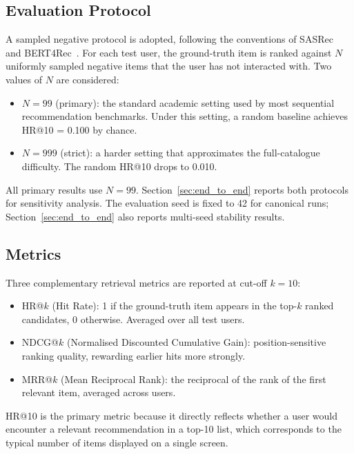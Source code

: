 \subsection{Evaluation Protocol}

A sampled negative protocol is adopted, following the conventions of SASRec~\cite{kang2018self} and BERT4Rec~\cite{sun2019bert4rec}.
For each test user, the ground-truth item is ranked against $N$ uniformly sampled negative items that the user has not interacted with.
Two values of $N$ are considered:

\begin{itemize}
    \item $N = 99$ (primary): the standard academic setting used by most sequential recommendation benchmarks.
    Under this setting, a random baseline achieves HR@10 = 0.100 by chance.
    \item $N = 999$ (strict): a harder setting that approximates the full-catalogue difficulty.
    The random HR@10 drops to 0.010.
\end{itemize}

All primary results use $N = 99$.
Section~\ref{sec:end_to_end} reports both protocols for sensitivity analysis.
The evaluation seed is fixed to 42 for canonical runs; Section~\ref{sec:end_to_end} also reports multi-seed stability results.

\subsection{Metrics}

Three complementary retrieval metrics are reported at cut-off $k = 10$:

\begin{itemize}
    \item HR@$k$ (Hit Rate): 1 if the ground-truth item appears in the top-$k$ ranked candidates, 0 otherwise. Averaged over all test users.
    \item NDCG@$k$ (Normalised Discounted Cumulative Gain): position-sensitive ranking quality, rewarding earlier hits more strongly.
    \item MRR@$k$ (Mean Reciprocal Rank): the reciprocal of the rank of the first relevant item, averaged across users.
\end{itemize}

HR@10 is the primary metric because it directly reflects whether a user would encounter a relevant recommendation in a top-10 list, which corresponds to the typical number of items displayed on a single screen.

